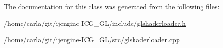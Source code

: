 The documentation for this class was generated from the following files\-:\begin{DoxyCompactItemize}
\item 
/home/carla/git/ijengine-\/\-I\-C\-G\-\_\-\-G\-L/include/\hyperlink{glshaderloader_8h}{glshaderloader.\-h}\item 
/home/carla/git/ijengine-\/\-I\-C\-G\-\_\-\-G\-L/src/\hyperlink{glshaderloader_8cpp}{glshaderloader.\-cpp}\end{DoxyCompactItemize}
